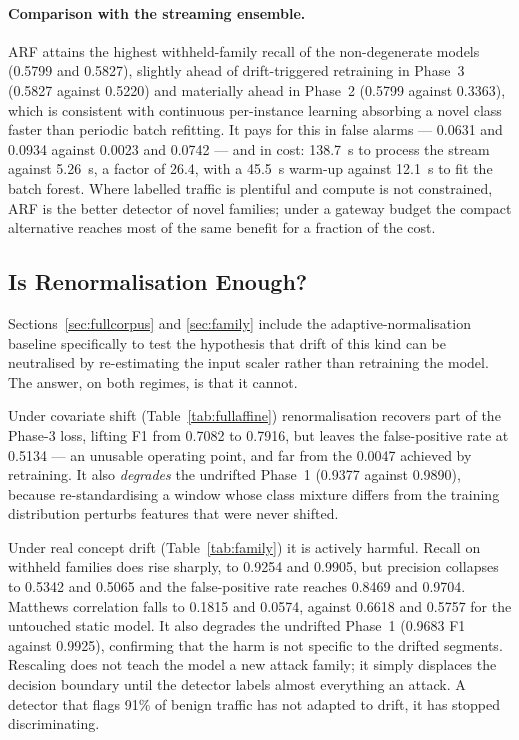 \documentclass[11pt,a4paper]{article}
\begin{document}
\paragraph{Comparison with the streaming ensemble.} ARF attains the highest
withheld-family recall of the non-degenerate models (0.5799 and 0.5827),
slightly ahead of drift-triggered retraining in Phase~3 (0.5827 against 0.5220)
and materially ahead in Phase~2 (0.5799 against 0.3363), which is consistent
with continuous per-instance learning absorbing a novel class faster than
periodic batch refitting. It pays for this in false alarms --- 0.0631 and 0.0934
against 0.0023 and 0.0742 --- and in cost: 138.7~s to process the stream against
5.26~s, a factor of 26.4, with a 45.5~s warm-up against 12.1~s to fit the batch
forest. Where labelled traffic is plentiful and compute is not constrained, ARF
is the better detector of novel families; under a gateway budget the compact
alternative reaches most of the same benefit for a fraction of the cost.

\subsection{Is Renormalisation Enough?}
\label{sec:renorm}

Sections~\ref{sec:fullcorpus} and \ref{sec:family} include the
adaptive-normalisation baseline specifically to test the hypothesis that drift
of this kind can be neutralised by re-estimating the input scaler rather than
retraining the model. The answer, on both regimes, is that it cannot.

Under covariate shift (Table~\ref{tab:fullaffine}) renormalisation recovers part
of the Phase-3 loss, lifting F1 from 0.7082 to 0.7916, but leaves the
false-positive rate at 0.5134 --- an unusable operating point, and far from the
0.0047 achieved by retraining. It also \emph{degrades} the undrifted Phase~1
(0.9377 against 0.9890), because re-standardising a window whose class mixture
differs from the training distribution perturbs features that were never
shifted.

Under real concept drift (Table~\ref{tab:family}) it is actively harmful. Recall
on withheld families does rise sharply, to 0.9254 and 0.9905, but precision
collapses to 0.5342 and 0.5065 and the false-positive rate reaches 0.8469 and
0.9704. Matthews correlation falls to 0.1815 and 0.0574, against 0.6618 and
0.5757 for the untouched static model. It also degrades the undrifted Phase~1
(0.9683 F1 against 0.9925), confirming that the harm is not specific to the
drifted segments. Rescaling does not teach the model a new attack family;
it simply displaces the decision boundary until the detector labels almost
everything an attack. A detector that flags 91\% of benign traffic has not
adapted to drift, it has stopped discriminating.
\end{document}
